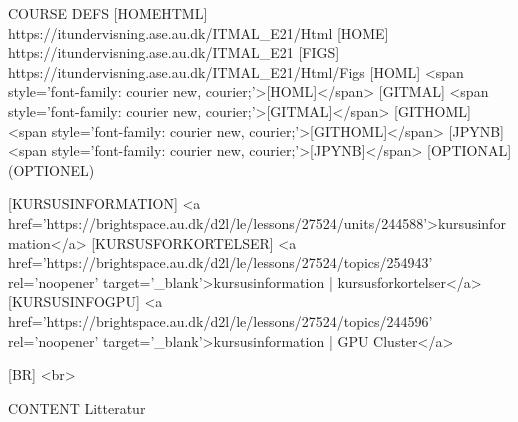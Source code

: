 COURSE
DEFS 
	[HOMEHTML] https://itundervisning.ase.au.dk/ITMAL_E21/Html
	[HOME]     https://itundervisning.ase.au.dk/ITMAL_E21
	[FIGS]     https://itundervisning.ase.au.dk/ITMAL_E21/Html/Figs
	[HOML]     <span style='font-family: courier new, courier;'>[HOML]</span>
	[GITMAL]   <span style='font-family: courier new, courier;'>[GITMAL]</span>
	[GITHOML]  <span style='font-family: courier new, courier;'>[GITHOML]</span>
	[JPYNB]    <span style='font-family: courier new, courier;'>[JPYNB]</span>
	[OPTIONAL] (OPTIONEL)

	[KURSUSINFORMATION]  <a href='https://brightspace.au.dk/d2l/le/lessons/27524/units/244588'>kursusinformation</a>
	[KURSUSFORKORTELSER] <a href='https://brightspace.au.dk/d2l/le/lessons/27524/topics/254943' rel='noopener' target='_blank'>kursusinformation | kursusforkortelser</a>
	[KURSUSINFOGPU]      <a href='https://brightspace.au.dk/d2l/le/lessons/27524/topics/244596' rel='noopener' target='_blank'>kursusinformation | GPU Cluster</a>
	
	[BR] <br>


CONTENT Litteratur






